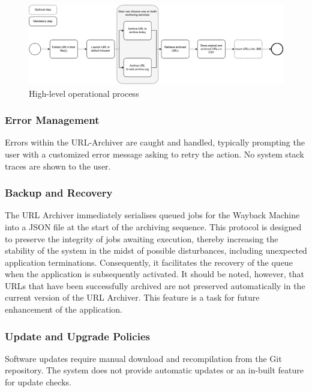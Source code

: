 \begin{figure}[b]
	\includegraphics[width=1\textwidth]{./diagrams/process_model-simple-horizontal.pdf}
	\centering
	\caption{High-level operational process}
	\label{fig:hl_operational_process}
\end{figure}

\subsubsection{Error Management}
Errors within the URL-Archiver are caught and handled, typically prompting the user with a customized error message asking to retry the action. No system stack traces are shown to the user.

\subsubsection{Backup and Recovery}
The URL Archiver immediately serialises queued jobs for the Wayback Machine into a JSON file at the start of the archiving sequence. This protocol is designed to preserve the integrity of jobs awaiting execution, thereby increasing the stability of the system in the midst of possible disturbances, including unexpected application terminations. Consequently, it facilitates the recovery of the queue when the application is subsequently activated. It should be noted, however, that URLs that have been successfully archived are not preserved automatically in the current version of the URL Archiver. This feature is a task for future enhancement of the application.

\subsubsection{Update and Upgrade Policies}
Software updates require manual download and recompilation from the Git repository. The system does not provide automatic updates or an in-built feature for update checks.